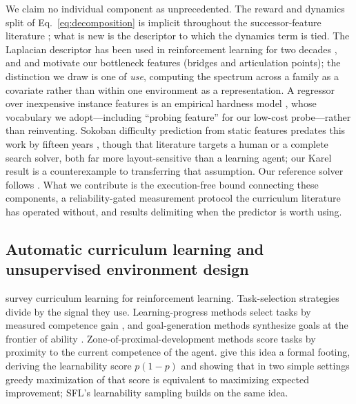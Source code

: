 \documentclass[twoside]{article}
\begin{document}
We claim no individual component as unprecedented. The reward and dynamics split of Eq.~\ref{eq:decomposition} is implicit throughout the successor-feature literature \citep{barreto2018transfer, lehnert2020successor}; what is new is the descriptor to which the dynamics term is tied. The Laplacian descriptor has been used in reinforcement learning for two decades \citep{mahadevan2005proto, machado2017laplacian, machado2018eigenoption}, and \citet{menache2002qcut} and \citet{simsek2005identifying} motivate our bottleneck features (bridges and articulation points); the distinction we draw is one of \emph{use}, computing the spectrum across a family as a covariate rather than within one environment as a representation. A regressor over inexpensive instance features is an empirical hardness model \citep{leytonbrown2009empirical, xu2008satzilla, hutter2014algorithm}, whose vocabulary we adopt---including ``probing feature'' for our low-cost probe---rather than reinventing. Sokoban difficulty prediction from static features predates this work by fifteen years \citep{ashlock2010evolution, vankreveld2015automated, kartal2016data}, though that literature targets a human or a complete search solver, both far more layout-sensitive than a learning agent; our Karel result is a counterexample to transferring that assumption. Our reference solver follows \citet{carvalho2024reclaiming}. What we contribute is the execution-free bound connecting these components, a reliability-gated measurement protocol the curriculum literature has operated without, and results delimiting when the predictor is worth using.



\subsection{Automatic curriculum learning and unsupervised environment design}

\citet{narvekar2020curriculum} survey curriculum learning for reinforcement learning. Task-selection strategies divide by the signal they use. Learning-progress methods select tasks by measured competence gain \citep{matiisen2019teacher, portelas2020teacher}, and goal-generation methods synthesize goals at the frontier of ability \citep{florensa2018automatic}. Zone-of-proximal-development methods score tasks by proximity to the current competence of the agent. \citet{tzannetos2023proximal} give this idea a formal footing, deriving the learnability score $p(1-p)$ and showing that in two simple settings greedy maximization of that score is equivalent to maximizing expected improvement; SFL's learnability sampling builds on the same idea.
\end{document}
